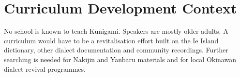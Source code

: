 \documentclass[12pt]{article}
\begin{document}
\section{Curriculum Development Context}
No school is known to teach Kunigami. Speakers are mostly older adults. A curriculum would have to be a revitalisation effort built on the Ie Island dictionary, other dialect documentation and community recordings. Further searching is needed for Nakijin and Yanbaru materials and for local Okinawan dialect-revival programmes.
\end{document}
